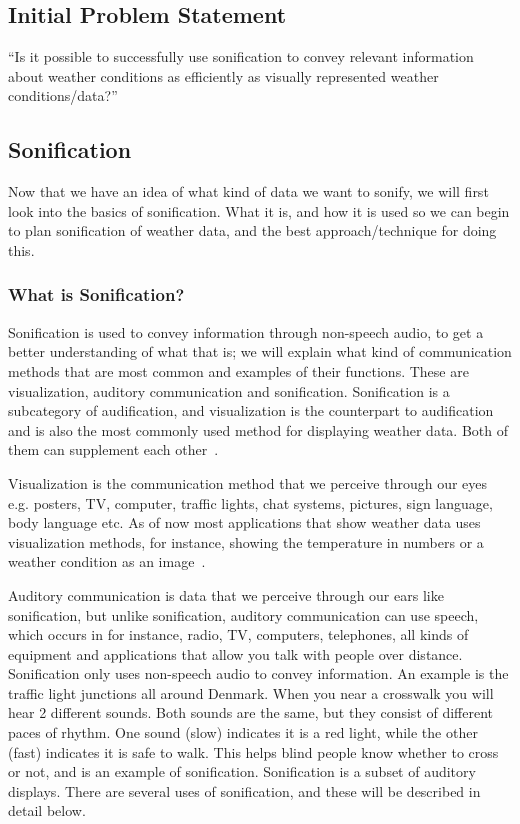 \subsection{Initial Problem Statement} %
\label{sub:initial_problem_statement}

\enquote{Is it possible to successfully use sonification to convey relevant information about weather conditions as efficiently as visually represented weather conditions/data?}



\subsection{Sonification} %
\label{sub:sonification}

Now that we have an idea of what kind of data we want to sonify, we will first look into the basics of sonification. 
What it is, and how it is used so we can begin to plan sonification of weather data, and the best approach/technique for doing this.


\subsubsection{What is Sonification?} %
\label{ssub:what_is_sonification_}

Sonification is used to convey information through non-speech audio, to get a better understanding of what that is; we will explain what kind of communication methods that are most common and examples of their functions.
These are visualization, auditory communication and sonification.
Sonification is a subcategory of audification, and visualization is the counterpart to audification and is also the most commonly used method for displaying weather data. 
Both of them can supplement each other~\cite[Ch. 1]{Hermann2011}.

Visualization is the communication method that we perceive through our eyes e.g. posters, TV, computer, traffic lights, chat systems, pictures, sign language, body language etc. 
As of now most applications that show weather data uses visualization methods, for instance, showing the temperature in numbers or a weather condition as an image~\cite[Sec. 1]{Friendly95}.

Auditory communication is data that we perceive through our ears like sonification, but unlike sonification, auditory communication can use speech, which occurs in for instance, radio, TV, computers, telephones, all kinds of equipment and applications that allow you talk with people over distance. 
Sonification only uses non-speech audio to convey information. 
An example is the traffic light junctions all around Denmark. When you near a crosswalk you will hear 2 different sounds. 
Both sounds are the same, but they consist of different paces of rhythm. 
One sound (slow) indicates it is a red light, while the other (fast) indicates it is safe to walk. 
This helps blind people know whether to cross or not, and is an example of sonification. Sonification is a subset of auditory displays. 
There are several uses of sonification, and these will be described in detail below.

